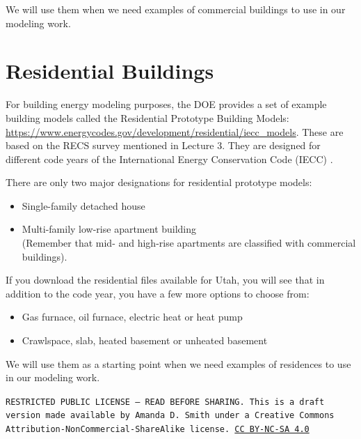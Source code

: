 \documentclass[10pt]{article}
\begin{document}
We will use them when we need examples of commercial buildings to use in our modeling work.

\section{Residential Buildings}

For building energy modeling purposes, the DOE provides a set of example building models called the Residential Prototype Building Models:  \url{https://www.energycodes.gov/development/residential/iecc_models}. These are based on the RECS survey mentioned in Lecture 3. They are designed for different code years of the International Energy Conservation Code (IECC) {\color{blue}\cite{IECCresources}}.

There are only two major designations for residential prototype models:
\begin{itemize}
    \setlength{\itemsep}{0pt}%
    \setlength{\parskip}{0pt}%
    \item Single-family detached house
    \item Multi-family low-rise apartment building\\(Remember that mid- and high-rise apartments are classified with commercial buildings).
\end{itemize}

If you download the residential files available for Utah, you will see that in addition to the code year, you have a few more options to choose from:

\begin{itemize}
    \setlength{\itemsep}{0pt}%
    \setlength{\parskip}{0pt}%
    \item Gas furnace, oil furnace, electric heat or heat pump
    \item Crawlspace, slab, heated basement or unheated basement
\end{itemize}

We will use them as a starting point when we need examples of residences to use in our modeling work.


\bigskip

\noindent
\texttt{\footnotesize RESTRICTED PUBLIC LICENSE --- READ BEFORE SHARING. This is a draft version made available by Amanda D. Smith under a Creative Commons Attribution-NonCommercial-ShareAlike license. 
\href{https://creativecommons.org/licenses/by-nc-sa/4.0/}{CC BY-NC-SA 4.0}}

\newpage
\printbibliography
\end{document}
